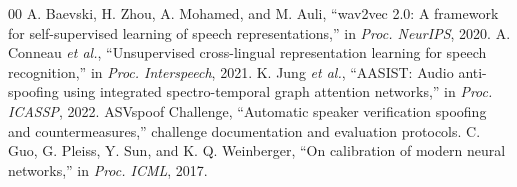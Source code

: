 \documentclass[journal]{IEEEtran}
\begin{document}
\begin{thebibliography}{00}
 A. Baevski, H. Zhou, A. Mohamed, and M. Auli, ``wav2vec 2.0: A framework for self-supervised learning of speech representations,'' in \emph{Proc. NeurIPS}, 2020.
 A. Conneau \emph{et al.}, ``Unsupervised cross-lingual representation learning for speech recognition,'' in \emph{Proc. Interspeech}, 2021.
 K. Jung \emph{et al.}, ``AASIST: Audio anti-spoofing using integrated spectro-temporal graph attention networks,'' in \emph{Proc. ICASSP}, 2022.
 ASVspoof Challenge, ``Automatic speaker verification spoofing and countermeasures,'' challenge documentation and evaluation protocols.
 C. Guo, G. Pleiss, Y. Sun, and K. Q. Weinberger, ``On calibration of modern neural networks,'' in \emph{Proc. ICML}, 2017.
\end{thebibliography}
\end{document}
